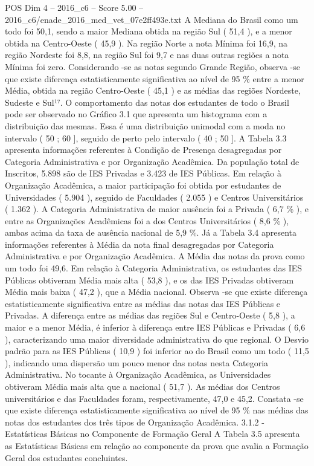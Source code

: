 \begin{textsample}{POS Dim 4 – 2016\_c6 – Score 5.00 – 2016\_c6/enade\_2016\_med\_vet\_07e2ff493e.txt}
A Mediana do Brasil como um todo foi 50,1, sendo a maior Mediana obtida na região Sul ( 51,4 ), e a menor obtida na Centro-Oeste ( 45,9 ).
Na região Norte a nota Mínima foi 16,9, na região Nordeste foi 8,8, na região Sul foi 9,7 e nas duas outras regiões a nota Mínima foi zero.
Considerando -se as notas segundo Grande Região, observa -se que existe diferença estatisticamente significativa ao nível de 95 \% entre a menor Média, obtida na região Centro-Oeste ( 45,1 ) e as médias das regiões Nordeste, Sudeste e Sul¹⁷.
O comportamento das notas dos estudantes de todo o Brasil pode ser observado no Gráfico 3.1 que apresenta um histograma com a distribuição das mesmas.
Essa é uma distribuição unimodal com a moda no intervalo ( 50 ; 60 ], seguido de perto pelo intervalo ( 40 ; 50 ].
A Tabela 3.3 apresenta informações referentes à Condição de Presença desagregadas por Categoria Administrativa e por Organização Acadêmica.
Da população total de Inscritos, 5.898 são de IES Privadas e 3.423 de IES Públicas.
Em relação à Organização Acadêmica, a maior participação foi obtida por estudantes de Universidades ( 5.904 ), seguido de Faculdades ( 2.055 ) e Centros Universitários ( 1.362 ).
A Categoria Administrativa de maior ausência foi a Privada ( 6,7 \% ), e entre as Organizações Acadêmicas foi a dos Centros Universitários ( 8,6 \% ), ambas acima da taxa de ausência nacional de 5,9 \%.
Já a Tabela 3.4 apresenta informações referentes à Média da nota final desagregadas por Categoria Administrativa e por Organização Acadêmica.
A Média das notas da prova como um todo foi 49,6.
Em relação à Categoria Administrativa, os estudantes das IES Públicas obtiveram Média mais alta ( 53,8 ), e os das IES Privadas obtiveram Média mais baixa ( 47,2 ), que a Média nacional.
Observa -se que existe diferença estatisticamente significativa entre as médias das notas das IES Públicas e Privadas.
A diferença entre as médias das regiões Sul e Centro-Oeste ( 5,8 ), a maior e a menor Média, é inferior à diferença entre IES Públicas e Privadas ( 6,6 ), caracterizando uma maior diversidade administrativa do que regional.
O Desvio padrão para as IES Públicas ( 10,9 ) foi inferior ao do Brasil como um todo ( 11,5 ), indicando uma dispersão um pouco menor das notas nesta Categoria Administrativa.
No tocante à Organização Acadêmica, as Universidades obtiveram Média mais alta que a nacional ( 51,7 ).
As médias dos Centros universitários e das Faculdades foram, respectivamente, 47,0 e 45,2.
Constata -se que existe diferença estatisticamente significativa ao nível de 95 \% nas médias das notas dos estudantes dos três tipos de Organização Acadêmica. 3.1.2 - Estatísticas Básicas no Componente de Formação Geral A Tabela 3.5 apresenta as Estatísticas Básicas em relação ao componente da prova que avalia a Formação Geral dos estudantes concluintes.

\end{textsample}
